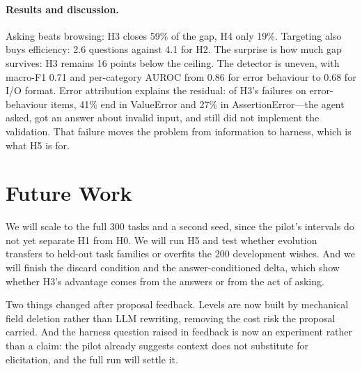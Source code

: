 \documentclass{article}
\begin{document}
\paragraph{Results and discussion.}
Asking beats browsing: H3 closes 59\% of the gap, H4 only 19\%. Targeting also buys efficiency: 2.6 questions against 4.1 for H2. The surprise is how much gap
survives: H3 remains 16 points below the ceiling. The detector is uneven, with macro-F1 0.71 and
per-category AUROC from 0.86 for error behaviour to 0.68 for I/O format. Error attribution
explains the residual: of H3's failures on error-behaviour items, 41\% end in ValueError and
27\% in AssertionError---the agent asked, got an answer about invalid input, and still did not
implement the validation. That failure moves the problem from information to harness, which is
what H5 is for.

\section{Future Work}

We will scale to the full 300 tasks and a second seed, since the pilot's intervals do not yet
separate H1 from H0. We will run H5 and test whether evolution transfers to held-out task
families or overfits the 200 development wishes. And we will finish the discard condition and
the answer-conditioned delta, which show whether H3's advantage comes from the answers or from
the act of asking.

Two things changed after proposal feedback. Levels are now built by mechanical field deletion
rather than LLM rewriting, removing the cost risk the proposal carried. And the harness question
raised in feedback is now an experiment rather than a claim: the pilot already suggests context
does not substitute for elicitation, and the full run will settle it.



\end{document}
